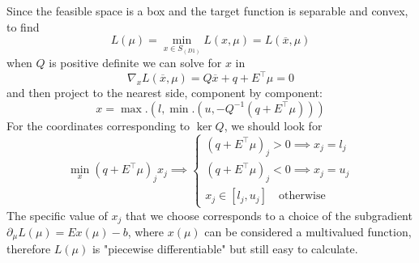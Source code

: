 \documentclass[10pt,twoside,book,a5paper]{ncc}
\begin{document}
Since the feasible space is a box and the target function is separable and convex, to find
\[
    L(\mu) = \min_{x \in S_{(D1)}} L(x, \mu) = L(\overline{x}, \mu)
\]
when $Q$ is positive definite we can solve for $x$ in
\[
    \nabla_x L(\overline{x}, \mu) = Q \overline{x} + q + E^\intercal\mu = 0
\]
and then project to the nearest side, component by component:
\[
    x = \max.(l, \min.(u, -Q^{-1}(q + E^\intercal\mu)))
\]
For the coordinates corresponding to $\ker Q$, we should look for
\[
    \label{eq:1}\min_x (q + E^\intercal \mu)_j x_j \implies \begin{cases}
        (q + E^\intercal \mu)_j > 0 \implies x_j = l_j \\
        (q + E^\intercal \mu)_j < 0 \implies x_j = u_j \\
        x_j \in [l_j, u_j] \quad \textrm{otherwise}
    \end{cases}
\]
The specific value of $x_j$ that we choose corresponds to a choice of the subgradient $\partial_\mu L(\mu) = E x(\mu) - b$, where $x(\mu)$ can be considered a multivalued function, therefore $L(\mu)$ is "piecewise differentiable" but still easy to calculate.
\end{document}
